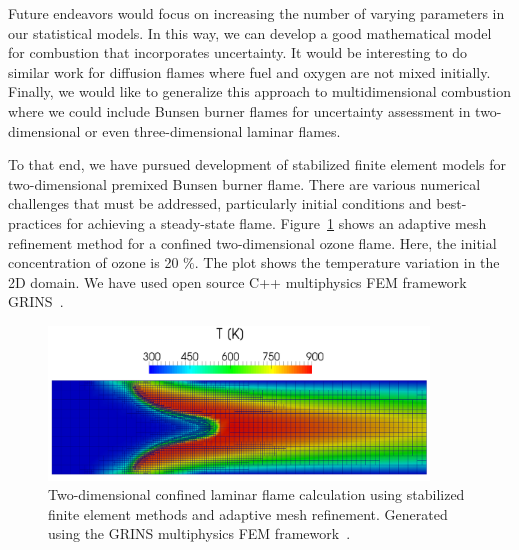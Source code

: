 Future endeavors would focus on increasing the number of varying
parameters in our statistical models. In this way,
we can develop a good mathematical model for
combustion that incorporates uncertainty.
It would be interesting to do similar work for diffusion
flames where fuel and oxygen are not mixed initially. Finally, we would like
to generalize this approach to multidimensional combustion where we
could include Bunsen burner flames for  uncertainty assessment in
two-dimensional or even three-dimensional laminar flames.

To that end, we have pursued development of stabilized
finite element models for two-dimensional premixed Bunsen burner
flame.
There are various numerical challenges that must be addressed,
particularly initial conditions and best-practices for achieving a
steady-state flame.
Figure~\ref{amr_flame} shows an adaptive mesh refinement method for
a confined two-dimensional ozone flame.
Here, the initial concentration of ozone is 20 $\%$.  The
plot shows the temperature variation in the 2D domain. We have used
open source C++ multiphysics FEM framework GRINS~\cite{GRINSPaper}.

 \begin{figure}[h]
   \centering
   \includegraphics[width=0.9\textwidth]{figs/flame_grins_2}
    \caption{Two-dimensional confined laminar flame calculation using
      stabilized finite element methods and adaptive mesh
      refinement. Generated using the GRINS multiphysics FEM
      framework~\cite{GRINSPaper}.}
    \label{amr_flame}
 \end{figure}
